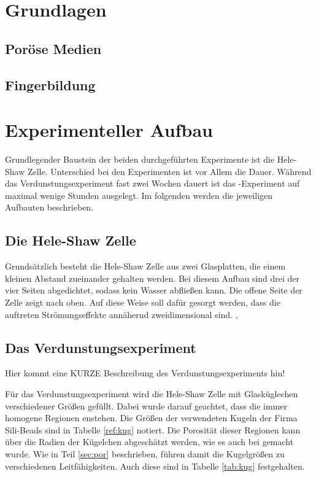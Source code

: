 \documentclass[oneside, a4paper, DIV=11]{scrartcl}
\begin{document}
\section{Grundlagen}
\label{sec:theo}
\subsection{Poröse Medien}
\label{theo:por}

\subsection{Fingerbildung}
\label{theo:fing}
\subsection{}


\section{Experimenteller Aufbau}
\label{sec:set}

Grundlegender Baustein der beiden durchgeführten Experimente ist die Hele-Shaw Zelle. Unterschied bei den Experimenten ist vor Allem die Dauer. Während das
Verdunstungsexperiment fast zwei Wochen dauert ist das \COT-Experiment auf maximal wenige Stunden ausgelegt. Im folgenden werden die jeweiligen Aufbauten beschrieben.

\subsection{Die Hele-Shaw Zelle}
\label{sec:hsc}
Grundsätzlich besteht die Hele-Shaw Zelle aus zwei 
Glasplatten, die einem kleinen Abstand zueinander gehalten werden. Bei diesem Aufbau sind drei der vier Seiten abgedichtet, sodass kein Wasser abfließen kann.
Die offene Seite der Zelle zeigt nach oben. Auf diese Weise soll dafür gesorgt werden, dass die auftreten Strömungseffekte annähernd zweidimensional sind.
, 


\subsection{Das Verdunstungsexperiment}
\label{set:eva}

Hier kommt eine KURZE Beschreibung des Verdunstungsexperiments hin!

Für das Verdunstungsexperiment wird die Hele-Shaw Zelle mit Glasküglechen verschiedener Größen gefüllt. Dabei wurde darauf geachtet, dass die immer homogene Regionen
enstehen. Die Größen der verwendeten Kugeln der Firma Sili-Beads sind in Tabelle \ref{ref:kug} notiert. Die Porosität
dieser Regionen kann über die Radien der Kügelchen abgeschätzt werden, wie es auch bei \cite{feustel} gemacht wurde. 
Wie in Teil \ref{sec:por} beschrieben, führen damit die Kugelgrößen zu verschiedenen Leitfähigkeiten. Auch diese sind in Tabelle \ref{tab:kug} festgehalten.
\end{document}
